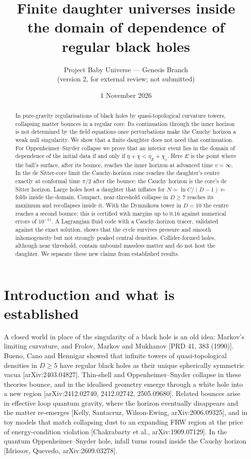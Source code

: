 \documentclass[11pt,a4paper]{article}
\title{Finite daughter universes inside the domain of dependence of regular black holes}
\author{Project Baby Universe --- Genesis Branch\\ \small(version 2, for external review; not submitted)}
\date{1 November 2026}
\theoremstyle{definition}\newtheorem{definition}[theorem]{Definition}
\theoremstyle{remark}\newtheorem{remark}[theorem]{Remark}
\begin{document}
\maketitle

\begin{abstract}
In pure-gravity regularisations of black holes by quasi-topological curvature towers, collapsing matter bounces in a regular core.
Its continuation through the inner horizon is not determined by the field equations once perturbations make the Cauchy horizon a weak
null singularity. We show that a finite daughter does not need that continuation. For Oppenheimer--Snyder collapse we prove that an
interior event lies in the domain of dependence of the initial data if and only if $\eta+\chi<\eta_E+\chi_s$. Here $E$ is the point
where the ball's surface, after its bounce, reaches the inner horizon at advanced time $v=\infty$. In the de Sitter-core limit the
Cauchy-horizon cone reaches the daughter's centre exactly at conformal time $\pi/2$ after the bounce: the Cauchy horizon is the core's
de Sitter horizon. Large holes host a daughter that inflates for $N\simeq\ln C/(D-1)$ e-folds inside the domain. Compact,
near-threshold collapse in $D\ge7$ reaches its maximum and recollapses inside it. With the Dymnikova tower in $D=10$ the centre reaches
a second bounce; this is certified with margins up to $0.16$ against numerical errors of $10^{-11}$. A Lagrangian fluid code with a
Cauchy-horizon tracer, validated against the exact solution, shows that the cycle survives pressure and smooth inhomogeneity but not
strongly peaked central densities. Collider-formed holes, although near threshold, contain unbound massless matter and do not host the
daughter. We separate these new claims from established results.
\end{abstract}

\section{Introduction and what is established}
A closed world in place of the singularity of a black hole is an old idea: Markov's limiting curvature, and Frolov, Markov and Mukhanov
[PRD 41, 383 (1990)]. Bueno, Cano and Hennigar showed that infinite towers of quasi-topological densities in $D\ge5$ have regular black
holes as their unique spherically symmetric vacua [arXiv:2403.04827]. Thin-shell and Oppenheimer--Snyder collapse in these theories
bounce, and in the idealised geometry emerge through a white hole into a new region [arXiv:2412.02740, 2412.02742, 2505.09680]. Related
bounces arise in effective loop quantum gravity, where the horizon eventually disappears and the matter re-emerges [Kelly, Santacruz,
Wilson-Ewing, arXiv:2006.09325], and in toy models that match collapsing dust to an expanding FRW region at the price of
energy-condition violation [Chakrabarty et al., arXiv:1909.07129]. In the quantum Oppenheimer--Snyder hole, infall turns round inside
the Cauchy horizon [Idrissov, Quevedo, arXiv:2609.03278].
\end{document}
